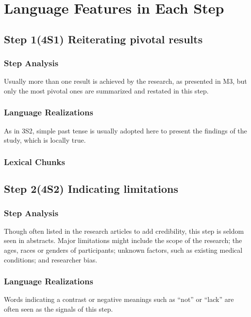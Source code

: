 \documentclass{ctexbook}
\begin{document}
\section{Language Features in Each Step}
  \subsection{Step 1(4S1) Reiterating pivotal results}
    \subsubsection{Step Analysis}

    Usually more than one result is achieved by the research, as presented in M3, but only the most pivotal ones are summarized and restated in this step.

    \subsubsection{Language Realizations}

    As in 3S2, simple past tense is usually adopted here to present the findings of the study, which is locally true.

    \subsubsection{Lexical Chunks}

  \subsection{Step 2(4S2) Indicating limitations}
    \subsubsection{Step Analysis}

    Though often listed in the research articles to add credibility, this step is seldom seen in abstracts. Major limitations might include the scope of the research; the ages, races or genders of participants; unknown factors, such as existing medical conditions; and researcher bias.

    \subsubsection{Language Realizations}

    Words indicating a contrast or negative meanings such as ``not'' or ``lack'' are often seen as the signals of this step.
\end{document}

